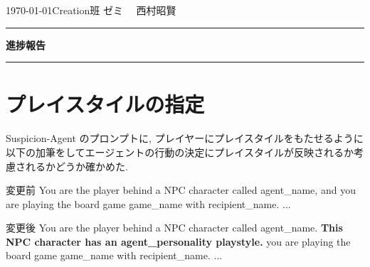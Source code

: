 \documentclass{jarticle}     %
\begin{document}
  \noindent
  \hspace{1em}

  \today Creation班 ゼミ
  \hfill
  \ \  西村昭賢 

  \vspace{2mm}
  \hrule
  \begin{center}
  {\Large \bf 進捗報告}
  \end{center}
  \hrule
  \vspace{3mm}


\section{プレイスタイルの指定}
Suspicion-Agent のプロンプトに, プレイヤーにプレイスタイルをもたせるように以下の加筆をしてエージェントの行動の決定にプレイスタイルが反映されるか考慮されるかどうか確かめた. \par
\begin{itembox}[l]{変更前}
  You are the player behind a NPC character called {agent\_name}, and you are playing the board game {game\_name} with {recipient\_name}. ...
\end{itembox}

\begin{itembox}[l]{変更後}
  You are the player behind a NPC character called {agent\_name}. \textbf{This NPC character has an {agent\_personality} playstyle.} you are playing the board game {game\_name} with {recipient\_name}. ... 
\end{itembox}
\end{document}
